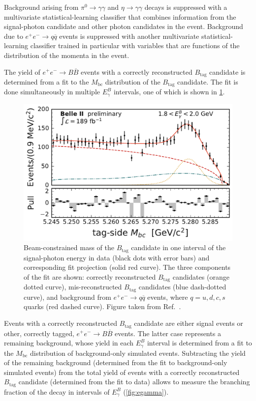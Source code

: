 \documentclass{moriond}
\def\Mbc{\ensuremath{M_{\mathrm{bc}}}\xspace}
\def\epem{\ensuremath{e^+e^-}\xspace}
\def\BB{\ensuremath{B\overline{B}}\xspace}
\def\Btag{\ensuremath{B_{\mathrm{tag}}}\xspace}
\begin{document}
Background arising from $\pi^0\to\gamma\gamma$ and $\eta\to\gamma\gamma$ decays is suppressed with a multivariate statistical-learning classifier that combines information from the signal-photon candidate and other photon candidates in the event.
Background due to $\epem\to q\overline{q}$ events is suppressed with another multivariate statistical-learning classifier trained in particular with variables that are functions of the distribution of the momenta in the event.

The yield of $\epem\to\BB$ events with a correctly reconstructed $B_{\mathrm{tag}}$ candidate is determined from a fit to the \Mbc distribution of the \Btag candidate.
The fit is done simultaneously in multiple $E_\gamma^B$ intervals, one of which is shown in \cref{fig:mbc_tag}.

\begin{figure}[tb]
\centering
\includegraphics[width=0.495\linewidth]{figures/xsgamma/MbcFit_1p8to2p0_data_pub.pdf}
\caption{Beam-constrained mass of the $B_{\mathrm{tag}}$ candidate in one interval of the signal-photon energy in data (black dots with error bars) and corresponding fit projection (solid red curve).
The three components of the fit are shown: correctly reconstructed $B_{\mathrm{tag}}$ candidates (orange dotted curve), mis-reconstructed $B_{\mathrm{tag}}$ candidates (blue dash-dotted curve), and background from $\epem\to q\overline{q}$ events, where $q=u,d,c,s$ quarks (red dashed curve).
Figure taken from Ref.~{\protect\cite{Belle-II:2022hys}}.
}
\label{fig:mbc_tag}
\end{figure}

Events with a correctly reconstructed $B_{\mathrm{tag}}$ candidate are either signal events or other, correctly tagged, $\epem\to\BB$ events.
The latter case represents a remaining background, whose yield in each $E_\gamma^B$ interval is determined from a fit to the \Mbc distribution of background-only simulated events.
Subtracting the yield of the remaining background (determined from the fit to background-only simulated events) from the total yield of events with a correctly reconstructed $B_{\mathrm{tag}}$ candidate (determined from the fit to data) allows to measure the branching fraction of the decay in intervals of $E_\gamma^B$ (\cref{fig:egamma}).
\end{document}
